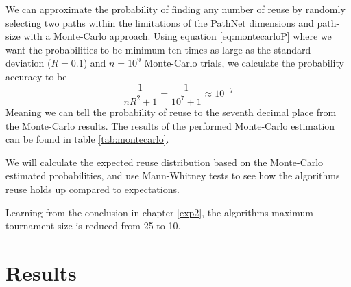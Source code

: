 

We can approximate the probability of finding any number of reuse by randomly selecting two paths within the limitations of the PathNet dimensions and path-size with a Monte-Carlo approach. Using equation \ref{eq:montecarloP} where we want the probabilities to be minimum ten times as large as the standard deviation (\(R=0.1\)) and \(n=10^{9}\) Monte-Carlo trials, we calculate the probability accuracy to be 
\begin{equation*}
    \frac{1}{nR^{2}+1}=\frac{1}{10^{7}+1}\approx10^{-7}
\end{equation*}
Meaning we can tell the probability of reuse to the seventh decimal place from the Monte-Carlo results. The results of the performed Monte-Carlo estimation can be found in table \ref{tab:montecarlo}.

We will calculate the expected reuse distribution based on the Monte-Carlo estimated probabilities, and use Mann-Whitney tests to see how the algorithms reuse holds up compared to expectations. 

Learning from the conclusion in chapter \ref{exp2}, the algorithms maximum tournament size is reduced from 25 to 10.

\section{Results}

